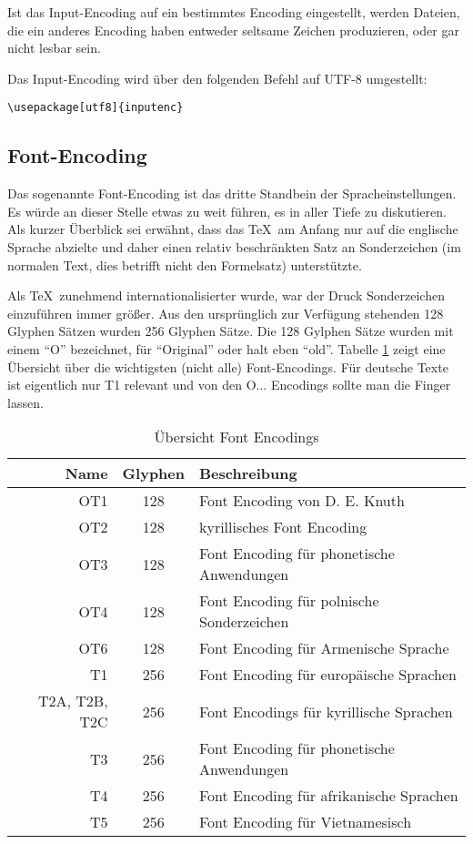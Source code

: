 Ist das Input-Encoding auf ein bestimmtes Encoding eingestellt, werden Dateien, die ein anderes Encoding haben entweder seltsame Zeichen produzieren, oder gar nicht lesbar sein. 

Das Input-Encoding wird über den folgenden Befehl auf UTF-8 umgestellt:
\begin{verbatim}
\usepackage[utf8]{inputenc}
\end{verbatim}

\subsection{Font-Encoding}

Das sogenannte Font-Encoding ist das dritte Standbein der Spracheinstellungen. Es würde an dieser Stelle etwas zu weit führen, es in aller Tiefe zu diskutieren. Als kurzer Überblick sei erwähnt, dass das \TeX\ am Anfang nur auf die englische Sprache abzielte und daher einen relativ beschränkten Satz an Sonderzeichen (im normalen Text, dies betrifft nicht den Formelsatz) unterstützte. 

Als \TeX\ zunehmend internationalisierter wurde, war der Druck Sonderzeichen einzuführen immer größer. Aus den ursprünglich zur Verfügung stehenden 128 Glyphen Sätzen wurden 256 Glyphen Sätze. Die 128 Gylphen Sätze wurden mit einem "`O"' bezeichnet, für "`Original"' oder halt eben "`old"'. Tabelle \ref{tab:encodings} zeigt eine Übersicht über die wichtigsten (nicht alle) Font-Encodings. Für deutsche Texte ist eigentlich nur T1 relevant und von den O... Encodings sollte man die Finger lassen.

\begin{table}[h]
\centering
\begin{tabular}{r|c|l}
\hline
\textbf{Name} & \textbf{Glyphen} & \textbf{Beschreibung} \\
\hline
OT1 & 128 & Font Encoding von D. E. Knuth \\
OT2 & 128 & kyrillisches Font Encoding \\
OT3 & 128 & Font Encoding für phonetische Anwendungen \\
OT4 & 128 & Font Encoding für polnische Sonderzeichen \\
OT6 & 128 & Font Encoding für Armenische Sprache \\
T1 & 256 & Font Encoding für europäische Sprachen \\
T2A, T2B, T2C & 256 & Font Encodings für kyrillische Sprachen \\
T3 & 256 & Font Encoding für phonetische Anwendungen \\
T4 & 256 & Font Encoding für afrikanische Sprachen \\
T5 & 256 & Font Encoding für Vietnamesisch \\
\hline
\end{tabular}\\[3mm]
\caption{Übersicht Font Encodings} \label{tab:encodings}
\end{table}


